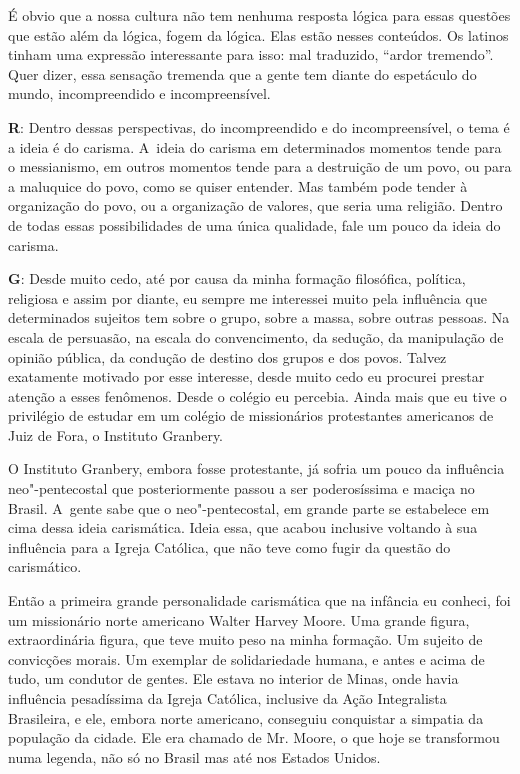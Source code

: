  

É obvio que a nossa cultura não tem nenhuma resposta lógica para essas
questões que estão além da lógica, fogem da lógica. Elas estão nesses
conteúdos. Os latinos tinham uma expressão interessante para isso: mal
traduzido, ``ardor tremendo''. Quer dizer, essa sensação tremenda que a
gente tem diante do espetáculo do mundo, incompreendido e
incompreensível.

 

\textbf{R}: Dentro dessas perspectivas, do incompreendido e do
incompreensível, o tema é a ideia é do carisma. A~ideia do carisma em
determinados momentos tende para o messianismo, em outros momentos tende
para a destruição de um povo, ou para a maluquice do povo, como se
quiser entender. Mas também pode tender à organização do povo, ou a
organização de valores, que seria uma religião. Dentro de todas essas
possibilidades de uma única qualidade, fale um pouco da ideia do
carisma.

 

\textbf{G}: Desde muito cedo, até por causa da minha formação
filosófica, política, religiosa e assim por diante, eu sempre me
interessei muito pela influência que determinados sujeitos tem sobre o
grupo, sobre a massa, sobre outras pessoas. Na escala de persuasão, na
escala do convencimento, da sedução, da manipulação de opinião pública,
da condução de destino dos grupos e dos povos. Talvez exatamente
motivado por esse interesse, desde muito cedo eu procurei prestar
atenção a esses fenômenos. Desde o colégio eu percebia. Ainda mais que
eu tive o privilégio de estudar em um colégio de missionários
protestantes americanos de Juiz de Fora, o Instituto Granbery.

 

O Instituto Granbery, embora fosse protestante, já sofria um pouco da
influência neo"-pentecostal que posteriormente passou a ser poderosíssima
e maciça no Brasil. A~gente sabe que o neo"-pentecostal, em grande parte
se estabelece em cima dessa ideia carismática. Ideia essa, que acabou
inclusive voltando à sua influência para a Igreja Católica, que não teve
como fugir da questão do carismático.

 

Então a primeira grande personalidade carismática que na infância eu
conheci, foi um missionário norte americano Walter Harvey Moore. Uma
grande figura, extraordinária figura, que teve muito peso na minha
formação. Um sujeito de convicções morais. Um exemplar de solidariedade
humana, e antes e acima de tudo, um condutor de gentes. Ele estava no
interior de Minas, onde havia influência pesadíssima da Igreja Católica,
inclusive da Ação Integralista Brasileira, e ele, embora norte
americano, conseguiu conquistar a simpatia da população da cidade. Ele
era chamado de Mr. Moore, o que hoje se transformou numa legenda, não só
no Brasil mas até nos Estados Unidos.

